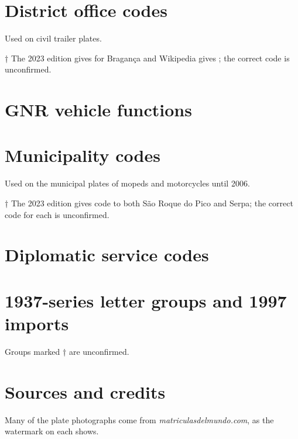 \section{District office codes}\label{sec:distritos}
Used on civil trailer plates.


{\small † The 2023 edition gives  for Bragança and Wikipedia gives
; the correct code is unconfirmed.}

\section{GNR vehicle functions}\label{sec:gnr}


\section{Municipality codes}\label{sec:municipios}
Used on the municipal plates of mopeds and motorcycles until 2006.


{\small † The 2023 edition gives code  to both São Roque do
Pico and Serpa; the correct code for each is unconfirmed.}

\section{Diplomatic service codes}\label{sec:codigos-diplomaticos}


\section{1937-series letter groups and 1997 imports}\label{sec:grupos}
Groups marked † are unconfirmed.


\section{Sources and credits}

Many of the plate photographs come from \emph{matriculasdelmundo.com}, as the
watermark on each shows.

